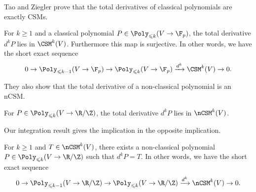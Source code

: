 Tao and Ziegler prove that the total derivatives of classical polynomials are exactly CSMs.

\begin{prop}[{\cite[Lemma 4.5]{TZ12}}]
\label{thm:integrate-csm}
For $k\geq 1$ and a classical polynomial $P\in\Poly_{\leqslant k}(V\to\F_p)$, the total derivative $d^kP$ lies in $\CSM^k(V)$. Furthermore this map is surjective. In other words, we have the short exact sequence
\[0\to \Poly_{\leqslant k-1}(V\to\F_p)\to\Poly_{\leqslant k}(V\to\F_p)\xrightarrow{d^k}\CSM^k(V)\to0.\]
\end{prop}

They also show that the total derivative of a non-classical polynomial is an nCSM.

\begin{prop}[{\cite[Eq. (4.1)]{TZ12}}]
For $P\in\Poly_{\leqslant k}(V\to\R/\Z)$, the total derivative $d^kP$ lies in $\nCSM^k(V)$.
\end{prop}

Our integration result gives the implication in the opposite implication.

\begin{prop}
\label{thm:integrate-ncsm}
For $k\geq 1$ and $T\in\nCSM^k(V)$, there exists a non-classical polynomial $P\in\Poly_{\leqslant k}(V\to\R/\Z)$ such that $d^kP=T$. In other words, we have the short exact sequence
\[0\to \Poly_{\leqslant k-1}(V\to\R/\Z)\to\Poly_{\leqslant k}(V\to\R/\Z)\xrightarrow{d^k}\nCSM^k(V)\to0.\]
\end{prop}

